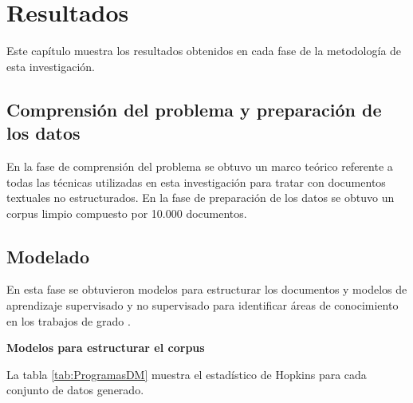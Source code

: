 \chapter{Resultados}

Este capítulo muestra los resultados obtenidos en cada fase de la metodología de esta investigación.

\section{Comprensión del problema y preparación de los datos}

En la fase de comprensión del problema se obtuvo  un marco teórico referente a todas las técnicas utilizadas en esta investigación para tratar con documentos textuales no estructurados.
En la fase de  preparación de los datos se obtuvo un corpus limpio compuesto por 10.000 documentos.

\section{Modelado}

En esta fase se obtuvieron modelos para estructurar los documentos y modelos de aprendizaje supervisado y no supervisado para identificar áreas de conocimiento en los trabajos de grado .

\textbf{Modelos para estructurar el corpus}

La tabla \ref{tab:ProgramasDM} muestra el estadístico de Hopkins para cada conjunto de datos generado. 


